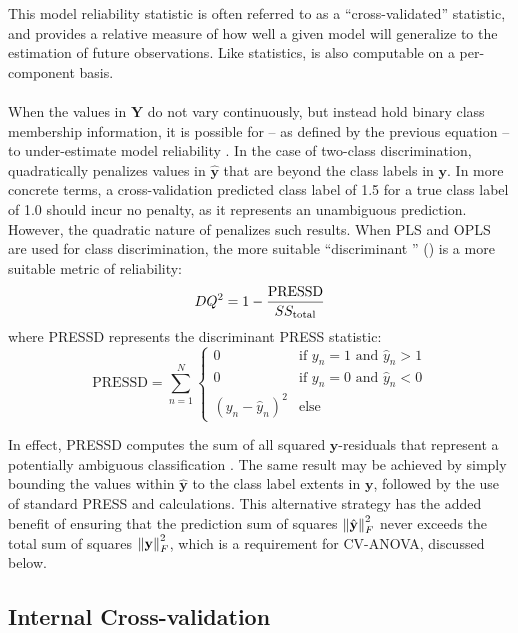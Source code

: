 \begin{doublespace}
This model reliability statistic is often referred to as a ``cross-validated''
\rsq{} statistic, and provides a relative measure of how well a given model
will generalize to the estimation of future observations. Like \rsq{}
statistics, \qsq{} is also computable on a per-component basis.
\\\\
When the values in $\mathbf{Y}$ do not vary continuously, but instead hold
binary class membership information, it is possible for \qsq{} -- as defined
by the previous equation -- to under-estimate model reliability
\cite{westerhuis:metab2008b}. In the case of two-class discrimination, \qsq{}
quadratically penalizes values in $\hat{\mathbf{y}}$ that are beyond the class
labels in $\mathbf{y}$. In more concrete terms, a cross-validation predicted
class label of 1.5 for a true class label of 1.0 should incur no penalty, as
it represents an unambiguous prediction. However, the quadratic nature of
\qsq{} penalizes such results. When PLS and OPLS are used for class
discrimination, the more suitable ``discriminant \qsq{}'' (\dqsq{}) is a more
suitable metric of reliability:
\begin{equation}
DQ^2 = 1 - \frac{\mathrm{PRESSD}}{SS_{\mathrm{total}}{}}
\end{equation}
where PRESSD represents the discriminant PRESS statistic:
\begin{equation}
\mathrm{PRESSD} = \sum_{n=1}^N
\begin{cases}
  0 & \text{if } y_n = 1 \text{ and } \hat{y}_n > 1 \\
  0 & \text{if } y_n = 0 \text{ and } \hat{y}_n < 0 \\
  (y_n - \hat{y}_n)^2 & \text{else}
\end{cases}
\end{equation}

In effect, PRESSD computes the sum of all squared $\mathbf{y}$-residuals that
represent a potentially ambiguous classification \cite{westerhuis:metab2008b}.
The same result may be achieved by simply bounding the values within
$\hat{\mathbf{y}}$ to the class label extents in $\mathbf{y}$, followed by the
use of standard PRESS and \qsq{} calculations. This alternative strategy has
the added benefit of ensuring that the prediction sum of squares
$\left\| \hat{\mathbf{y}} \right\|_F^2$ never exceeds the total sum of squares
$\left\| \mathbf{y} \right\|_F^2$, which is a requirement for CV-ANOVA, discussed below.
\end{doublespace}

\subsection{Internal Cross-validation}

